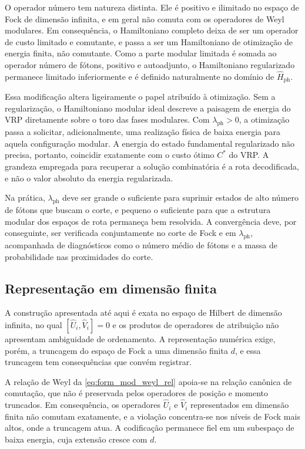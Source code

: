         O operador número tem natureza distinta. Ele é positivo e ilimitado no espaço de Fock de dimensão infinita, e em geral não comuta com os operadores de Weyl modulares. Em consequência, o Hamiltoniano completo deixa de ser um operador de custo limitado e comutante, e passa a ser um Hamiltoniano de otimização de energia finita, não comutante. Como a parte modular limitada é somada ao operador número de fótons, positivo e autoadjunto, o Hamiltoniano regularizado permanece limitado inferiormente e é definido naturalmente no domínio de $\hat{H}_{\text{ph}}$.

        Essa modificação altera ligeiramente o papel atribuído à otimização. Sem a regularização, o Hamiltoniano modular ideal descreve a paisagem de energia do VRP diretamente sobre o toro das fases modulares. Com $\lambda_{\text{ph}} > 0$, a otimização passa a solicitar, adicionalmente, uma realização física de baixa energia para aquela configuração modular. A energia do estado fundamental regularizado não precisa, portanto, coincidir exatamente com o custo ótimo $C^{\ast}$ do VRP. A grandeza empregada para recuperar a solução combinatória é a rota decodificada, e não o valor absoluto da energia regularizada.

        Na prática, $\lambda_{\text{ph}}$ deve ser grande o suficiente para suprimir estados de alto número de fótons que buscam o corte, e pequeno o suficiente para que a estrutura modular dos espaços de rota permaneça bem resolvida. A convergência deve, por conseguinte, ser verificada conjuntamente no corte de Fock e em $\lambda_{\text{ph}}$, acompanhada de diagnósticos como o número médio de fótons e a massa de probabilidade nas proximidades do corte.

    \subsection{Representação em dimensão finita}\label{subsec:form_mod_truncagem}

        A construção apresentada até aqui é exata no espaço de Hilbert de dimensão infinita, no qual $[\hat{U}_i, \hat{V}_i] = 0$ e os produtos de operadores de atribuição não apresentam ambiguidade de ordenamento. A representação numérica exige, porém, a truncagem do espaço de Fock a uma dimensão finita $d$, e essa truncagem tem consequências que convém registrar.

        A relação de Weyl da \autoref{eq:form_mod_weyl_rel} apoia-se na relação canônica de comutação, que não é preservada pelos operadores de posição e momento truncados. Em consequência, os operadores $\hat{U}_i$ e $\hat{V}_i$ representados em dimensão finita não comutam exatamente, e a violação concentra-se nos níveis de Fock mais altos, onde a truncagem atua. A codificação permanece fiel em um subespaço de baixa energia, cuja extensão cresce com $d$.

